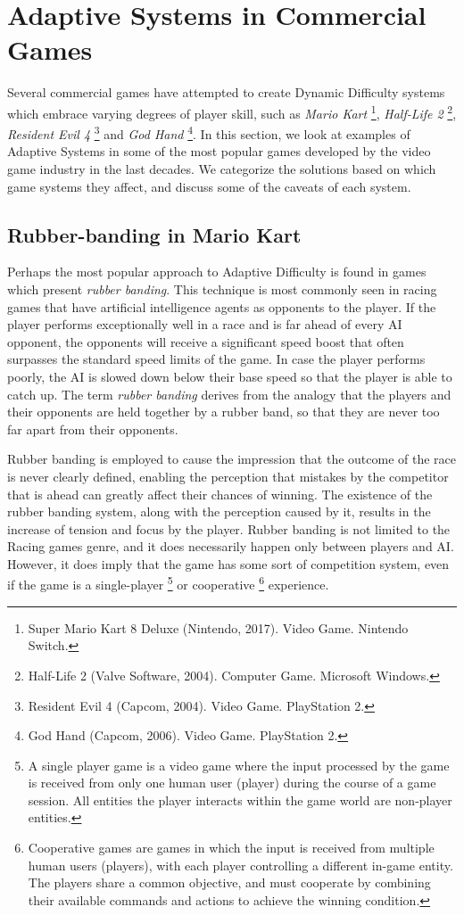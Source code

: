 \documentclass[cic,tc,english]{iiufrgs}
\begin{document}
\section{Adaptive Systems in Commercial Games}

Several commercial games have attempted to create Dynamic Difficulty systems which embrace varying degrees of player skill, such as \emph{Mario Kart} \footnote{Super Mario Kart 8 Deluxe (Nintendo, 2017). Video Game. Nintendo Switch.}, \emph{Half-Life 2} \footnote{Half-Life 2 (Valve Software, 2004). Computer Game. Microsoft Windows.}, \emph{Resident Evil 4} \footnote{Resident Evil 4 (Capcom, 2004). Video Game. PlayStation 2.} and \emph{God Hand} \footnote{God Hand (Capcom, 2006). Video Game. PlayStation 2.}. In this section, we look at examples of Adaptive Systems in some of the most popular games developed by the video game industry in the last decades. We categorize the solutions based on which game systems they affect, and discuss some of the caveats of each system.

\subsection{Rubber-banding in Mario Kart}

Perhaps the most popular approach to Adaptive Difficulty is found in games which present \emph{rubber banding}. This technique is most commonly seen in racing games that have artificial intelligence agents as opponents to the player. If the player performs exceptionally well in a race and is far ahead of every AI opponent, the opponents will receive a significant speed boost that often surpasses the standard speed limits of the game. In case the player performs poorly, the AI is slowed down below their base speed so that the player is able to catch up. The term \emph{rubber banding} derives from the analogy that the players and their opponents are held together by a rubber band, so that they are never too far apart from their opponents.

Rubber banding is employed to cause the impression that the outcome of the race is never clearly defined, enabling the perception that mistakes by the competitor that is ahead can greatly affect their chances of winning. The existence of the rubber banding system, along with the perception caused by it, results in the increase of tension and focus by the player. Rubber banding is not limited to the Racing games genre, and it does necessarily happen only between players and AI. However, it does imply that the game has some sort of competition system, even if the game is a single-player \footnote{A single player game is a video game where the input processed by the game is received from only one human user (player) during the course of a game session. All entities the player interacts within the game world are non-player entities.} or cooperative \footnote{Cooperative games are games in which the input is received from multiple human users (players), with each player controlling a different in-game entity. The players share a common objective, and must cooperate by combining their available commands and actions to achieve the winning condition.} experience.
\end{document}
